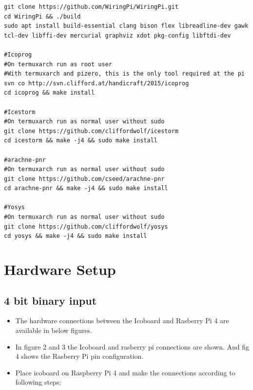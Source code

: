 \documentclass[journal,12pt,twocolumn]{IEEEtran}
\begin{document}
\begin{lstlisting}
git clone https://github.com/WiringPi/WiringPi.git
cd WiringPi && ./build
sudo apt install build-essential clang bison flex libreadline-dev gawk tcl-dev libffi-dev mercurial graphviz xdot pkg-config libftdi-dev

#Icoprog
#On termuxarch run as root user
#With termuxarch and pizero, this is the only tool required at the pi
svn co http://svn.clifford.at/handicraft/2015/icoprog
cd icoprog && make install

#Icestorm
#On termuxarch run as normal user without sudo
git clone https://github.com/cliffordwolf/icestorm
cd icestorm && make -j4 && sudo make install

#arachne-pnr
#On termuxarch run as normal user without sudo
git clone https://github.com/cseed/arachne-pnr
cd arachne-pnr && make -j4 && sudo make install

#Yosys
#On termuxarch run as normal user without sudo
git clone https://github.com/cliffordwolf/yosys
cd yosys && make -j4 && sudo make install

\end{lstlisting}
\section{Hardware Setup}
\subsection{4 bit binary input}
\begin{itemize}


\item The hardware connections between the Icoboard and Rasberry Pi 4 are available in below figures.\\

\item In figure 2 and 3 the Icoboard and rasberry pi connections are shown. And fig 4 shows the Rasberry Pi pin configuration.

\item Place icoboard on Raspberry Pi 4 and make the connections according to following steps:
\end{itemize}
\end{document}
